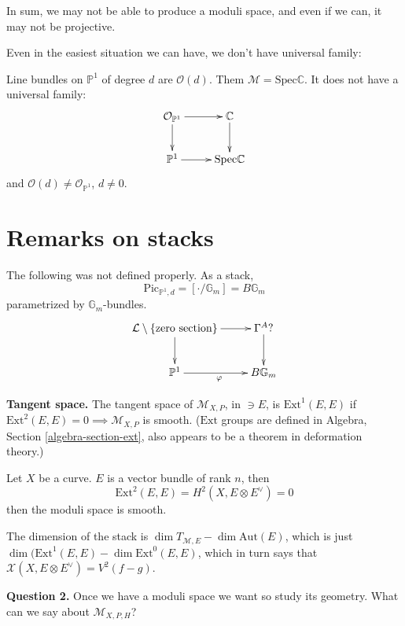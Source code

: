 In sum, we may not be able to produce a moduli space, and even if we can, it may
not be projective.

Even in the easiest situation we can have, we don't have universal family:

\begin{example}
\label{example-moduli-space-of-line-bundles-of-degree-d-over-P1-
do-not-have-universal-family}
Line bundles on $\mathbb{P}^1$ of degree $d$ are $\mathcal{O}(d)$. Them
$\mathcal{M}=\text{Spec}\mathbb{C}$. It does not have a universal family:
$$
\xymatrix{
\mathcal{O}_{\mathbb{P}^1}\ar[r]\ar[d]&\mathbb{C}\ar[d]\\
\mathbb{P}^1\ar[r]&\text{Spec}\mathbb{C}
}
$$
and $\mathcal{O}(d) \neq \mathcal{O}_{\mathbb{P}^1}$, $d\neq 0$.
\end{example}


\section*{Remarks on stacks}
\label{section-remarks-on-stacks}

The following was not defined properly. As a stack,
$$
\text{Pic}_{\mathbb{P}^1,d}=\left[ \cdot/\mathbb{G}_m \right] = B\mathbb{G}_m
$$
parametrized by $\mathbb{G}_m$-bundles.
$$
\xymatrix{
\mathcal{L}\setminus\{\text{zero section}\}\ar[r]\ar[d]&\Gamma^A?\ar[d]\\
\mathbb{P}^1\ar[r]_\varphi&B\mathbb{G}_m
}
$$

{\bf Tangent space.} The tangent space of $\mathcal{M}_{X,P}$, in $\ni E$, is
$\text{Ext}^1(E,E)$ if $\text{Ext}^2(E,E)=0 \implies  \mathcal{M}_{X,P}$ is
smooth. ($\text{Ext}$ groups are defined in Algebra, Section
\ref{algebra-section-ext}, also appears to be a theorem in deformation theory.)

\begin{example}
\label{example-moduli-space-of-curves-is-smooth}
Let $X$ be a curve. $E$ is a vector bundle of rank $n$, then
$$
\text{Ext}^2(E,E)=H^{2}(X,E \otimes E^{\vee})=0
$$
then the moduli space is smooth.
\end{example}

The dimension of the stack is $\dim T_{\mathcal{M},E}-\dim \text{Aut}(E)$, which
is just $\dim (\text{Ext}^1(E,E) - \dim \text{Ext}^0(E,E)$, which in turn says
that $\mathcal{X}(X,E \otimes E^\vee)=V^2(f-g)$.

{\bf Question 2.} Once we have a moduli space we want so study its geometry. 
What can we say about $\mathcal{M}_{X,P,H}$?

